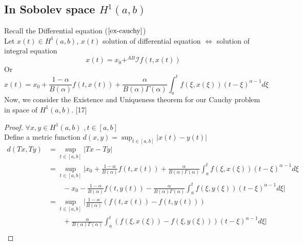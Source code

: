 \documentclass[twoside]{book}
\begin{document}
{\subsection{In Sobolev space $H^1 (a,b)$}
Recall the Differential equation ($\ref{ex-cauchy}$)\\
Let $x(t) \in H^1(a,b)$, $x(t)$ solution of differential equation $\iff$ solution of integral equation\\
$$x(t) = x_0 + ^{AB}\mathscr{I} f(t,x(t))$$
Or
$$x(t) = x_0 + \frac{1-\alpha}{B(\alpha)} f(t,x(t)) + \frac{\alpha}{B(\alpha) \Gamma(\alpha)} \int_a^t f(\xi,x(\xi)) (t-\xi)^{\alpha -1} d\xi$$
Now, we consider the Existence and Uniqueness theorem for our Cauchy problem in space of $H^1(a,b)$. [17]
\begin{proof}
    $\forall x,y \in H^1(a,b) \,\, , t \in [a,b]$\\
    Define a metric function $d(x,y) = \sup_{t \in [a,b]} |x(t) - y(t)|$
    \begin{align*}
        d(Tx,Ty) & = \sup_{t \in [a,b]} \left|Tx - Ty \right|                                                                                                                                                            \\
                 & = \sup_{t \in [a,b]} | x_0 + \frac{1-\alpha}{B(\alpha)} f(t,x(t)) + \frac{\alpha}{B(\alpha)\Gamma(\alpha)} \int_a^t f(\xi,x(\xi)) (t-\xi)^{\alpha -1} d\xi                                            \\
                 & \qquad - x_0 - \frac{1-\alpha}{B(\alpha)} f(t,y(t))  - \frac{\alpha}{B(\alpha)\Gamma(\alpha)} \int_a^t f(\xi,y(\xi)) (t-\xi)^{\alpha -1} d\xi  |                                                      \\
                 & = \sup_{t \in[a,b]} |\frac{1-\alpha}{B(\alpha)} (f(t,x(t)) - f(t,y(t)))                                                                                                                               \\
                 & \qquad + \frac{\alpha}{B(\alpha)\Gamma(\alpha)} \int_a^t ( f(\xi,x(\xi))-f(\xi,y(\xi)) ) (t-\xi)^{\alpha -1} d\xi|                                                                                    \\

\end{align*}
\end{proof}}
\end{document}
